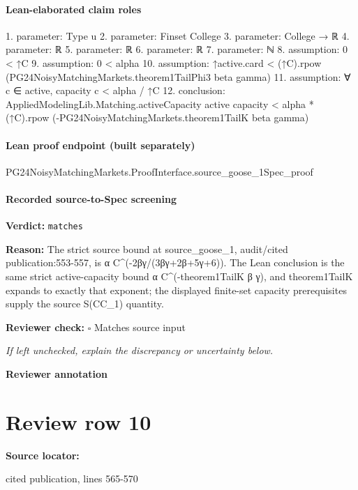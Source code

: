 \documentclass[10pt]{article}
\newcommand{\reviewerbox}{%
  \par\noindent\fbox{\parbox{0.96\linewidth}{\rule{0pt}{0.38in}}}\par
}
\newcommand{\reviewmatch}[1]{%
  \par\noindent\textbf{Reviewer check:} $\square$\; #1\par
  \noindent\emph{If left unchecked, explain the discrepancy or uncertainty below.}\par
}
\begin{document}
\paragraph{Lean-elaborated claim roles}\begin{ReviewVerbatim}
1. parameter: Type u
2. parameter: Finset College
3. parameter: College → ℝ
4. parameter: ℝ
5. parameter: ℝ
6. parameter: ℝ
7. parameter: ℕ
8. assumption: 0 < ↑C
9. assumption: 0 < alpha
10. assumption: ↑active.card < (↑C).rpow (PG24NoisyMatchingMarkets.theorem1TailPhi3 beta gamma)
11. assumption: ∀ c ∈ active, capacity c < alpha / ↑C
12. conclusion: AppliedModelingLib.Matching.activeCapacity active capacity <
  alpha * (↑C).rpow (-PG24NoisyMatchingMarkets.theorem1TailK beta gamma)
\end{ReviewVerbatim}

\paragraph{Lean proof endpoint (built separately)}\begin{ReviewVerbatim}
PG24NoisyMatchingMarkets.ProofInterface.source_goose_1Spec_proof
\end{ReviewVerbatim}

\paragraph{Recorded source-to-Spec screening}
\textbf{Verdict:} \texttt{matches}
\\
{\raggedright
\textbf{Reason:} The strict source bound at source\_\allowbreak{}goose\_\allowbreak{}1, audit/\allowbreak{}cited publication:\allowbreak{}553-\allowbreak{}557, is α C\textasciicircum{}(-\allowbreak{}2βγ/\allowbreak{}(3βγ+2β+5γ+6)).\allowbreak{} The Lean conclusion is the same strict active-\allowbreak{}capacity bound α C\textasciicircum{}(-\allowbreak{}theorem1TailK β γ), and theorem1TailK expands to exactly that exponent;\allowbreak{} the displayed finite-\allowbreak{}set capacity prerequisites supply the source S(CC\_\allowbreak{}1) quantity.\allowbreak{}
\par}
\reviewmatch{Matches source input}
\noindent\textbf{Reviewer annotation}\par
\reviewerbox
\clearpage
\hypertarget{source-claim-0288a6d97ff1b834}{}
\section*{Review row 10}
\textbf{Source locator:} {\footnotesize\raggedright cited publication, lines 565-\allowbreak{}570\par}
\end{document}
